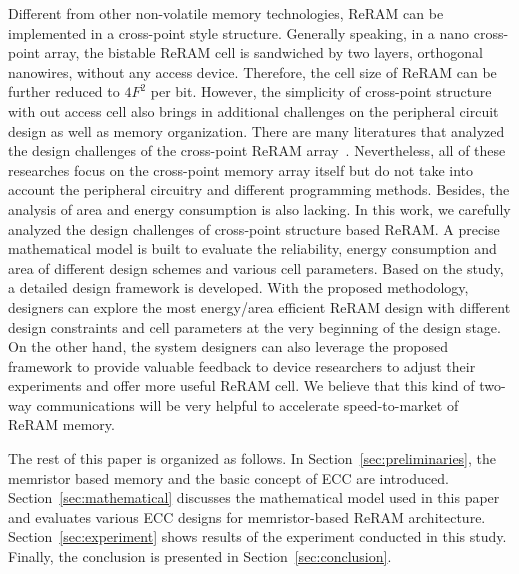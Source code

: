 Different from other non-volatile memory technologies, ReRAM can be implemented in a cross-point style structure. Generally speaking, in a nano cross-point array, the bistable ReRAM cell is sandwiched by two layers, orthogonal nanowires, without any access device. Therefore, the cell size of ReRAM can be further reduced to $4F^2$ per bit. However, the simplicity of cross-point structure with out access cell also brings in additional challenges on the peripheral circuit design as well as memory organization. There are many literatures that analyzed the design challenges of the cross-point ReRAM array~\cite{crossbar_NANO08_Flocke}\cite{crossbar_NANO2002_Ziegler}\cite{crossbar_NANO2003_Ziegler}\cite{crossbar_TED_2010}. Nevertheless, all of these researches focus on the cross-point memory array itself but do not take into account the peripheral circuitry and different programming methods. Besides, the analysis of area and energy consumption is also lacking. In this work, we carefully analyzed the design challenges of cross-point structure based ReRAM. A precise mathematical model is built to evaluate the reliability, energy consumption and area of different design schemes and various cell parameters. Based on the study, a detailed design framework is developed. With the proposed methodology, designers can explore the most energy/area efficient ReRAM design with different design constraints and cell parameters at the very beginning of the design stage. On the other hand, the system designers can also leverage the proposed framework to provide valuable feedback to device researchers to adjust their experiments and offer more useful ReRAM cell. We believe that this kind of two-way communications will be very helpful to accelerate speed-to-market of ReRAM memory.

The rest of this paper is organized as follows. In
Section~\ref{sec:preliminaries}, the memristor based memory and the basic
concept of ECC are introduced. Section~\ref{sec:mathematical} discusses the mathematical model used in this paper and evaluates various ECC
designs for memristor-based ReRAM architecture. Section~\ref{sec:experiment} shows results of the experiment conducted in this study. Finally, the conclusion is presented in Section~\ref{sec:conclusion}.

